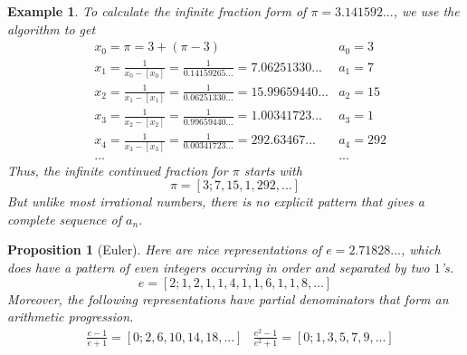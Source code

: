\documentclass{article}
\newtheorem{proposition}[theorem]{Proposition}
\newtheorem{example}{Example}[section]
\theoremstyle{remark}
\theoremstyle{definition}
\begin{document}
\begin{example}
To calculate the infinite fraction form of $\pi = 3.141592...$, we use the algorithm to get
\begin{align*}
    &x_0 = \pi = 3 + (\pi-3) & a_0 = 3 \\
    &x_1 = \frac{1}{x_0 - [x_0]} = \frac{1}{0.14159265...} = 7.06251330... & a_1 = 7\\
    &x_2 = \frac{1}{x_1 - [x_1]} = \frac{1}{0.06251330...} = 15.99659440... & a_2 = 15\\
    &x_3 = \frac{1}{x_2 - [x_2]} = \frac{1}{0.99659440...} = 1.00341723... & a_3 = 1\\
    &x_4 = \frac{1}{x_3 - [x_3]} = \frac{1}{0.00341723...} = 292.63467... & a_4 = 292\\
    & ... & ...
\end{align*}
Thus, the infinite continued fraction for $\pi$ starts with 
\[\pi = [3;7, 15, 1, 292, ...]\]
But unlike most irrational numbers, there is no explicit pattern that gives a complete sequence of $a_n$. 
\end{example}

\begin{proposition}[Euler]
Here are nice representations of $e = 2.71828...$, which does have a pattern of even integers occurring in order and separated by two $1$'s. 
\[e = [2; 1, 2, 1, 1, 4, 1, 1, 6, 1, 1, 8, ...]\]
Moreover, the following representations have partial denominators that form an arithmetic progression. 
\begin{align*}
    & \frac{e-1}{e+1} = [0;2, 6, 10, 14, 18, ...]
    & \frac{e^2 - 1}{e^2 + 1} = [0; 1, 3, 5, 7, 9, ...]
\end{align*}
\end{proposition}
\end{document}

